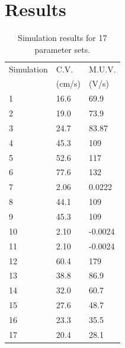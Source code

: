 \documentclass[12pt]{article}
\begin{document}
\section{Results}
\begin{table}
	
	\centering
	\caption{Simulation results for 17 parameter sets.}
	
	\begin{tabular}{|l|l|l|}
		\hline
		Simulation & C.V.   & M.U.V.  \\ 
		& (cm/s) & (V/s)   \\ \hline
		1          & 16.6   & 69.9    \\ \hline
		2          & 19.0   & 73.9    \\ \hline
		3          & 24.7   & 83.87   \\ \hline
		4          & 45.3   & 109     \\ \hline
		5          & 52.6   & 117     \\ \hline
		6          & 77.6   & 132     \\ \hline
		7          & 2.06   & 0.0222  \\ \hline
		8          & 44.1   & 109     \\ \hline
		9          & 45.3   & 109     \\ \hline
		10         & 2.10   & -0.0024 \\ \hline
		11         & 2.10   & -0.0024 \\ \hline
		12         & 60.4   & 179     \\ \hline
		13         & 38.8   & 86.9    \\ \hline
		14         & 32.0   & 60.7    \\ \hline
		15         & 27.6   & 48.7    \\ \hline
		16         & 23.3   & 35.5    \\ \hline
		17         & 20.4   & 28.1    \\ \hline
	\end{tabular}
	\label{tab:r1}
\end{table}
\end{document}
